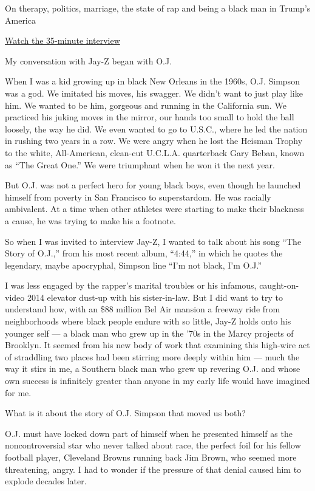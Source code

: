 On therapy, politics, marriage, the state of rap and being a black man
in Trump's America

\href{http://www.nytimes3xbfgragh.onion/video/t-magazine/100000005574909/jayz-interview.html}{Watch
the 35-minute interview}

My conversation with Jay-Z began with O.J.

When I was a kid growing up in black New Orleans in the 1960s, O.J.
Simpson was a god. We imitated his moves, his swagger. We didn't want to
just play like him. We wanted to be him, gorgeous and running in the
California sun. We practiced his juking moves in the mirror, our hands
too small to hold the ball loosely, the way he did. We even wanted to go
to U.S.C., where he led the nation in rushing two years in a row. We
were angry when he lost the Heisman Trophy to the white, All-American,
clean-cut U.C.L.A. quarterback Gary Beban, known as ``The Great One.''
We were triumphant when he won it the next year.

But O.J. was not a perfect hero for young black boys, even though he
launched himself from poverty in San Francisco to superstardom. He was
racially ambivalent. At a time when other athletes were starting to make
their blackness a cause, he was trying to make his a footnote.

So when I was invited to interview Jay-Z, I wanted to talk about his
song ``The Story of O.J.,'' from his most recent album, ``4:44,'' in
which he quotes the legendary, maybe apocryphal, Simpson line ``I'm not
black, I'm O.J.''

I was less engaged by the rapper's marital troubles or his infamous,
caught-on-video 2014 elevator dust-up with his sister-in-law. But I did
want to try to understand how, with an \$88 million Bel Air mansion a
freeway ride from neighborhoods where black people endure with so
little, Jay-Z holds onto his younger self --- a black man who grew up in
the '70s in the Marcy projects of Brooklyn. It seemed from his new body
of work that examining this high-wire act of straddling two places had
been stirring more deeply within him --- much the way it stirs in me, a
Southern black man who grew up revering O.J. and whose own success is
infinitely greater than anyone in my early life would have imagined for
me.

What is it about the story of O.J. Simpson that moved us both?

O.J. must have locked down part of himself when he presented himself as
the noncontroversial star who never talked about race, the perfect foil
for his fellow football player, Cleveland Browns running back Jim Brown,
who seemed more threatening, angry. I had to wonder if the pressure of
that denial caused him to explode decades later.

